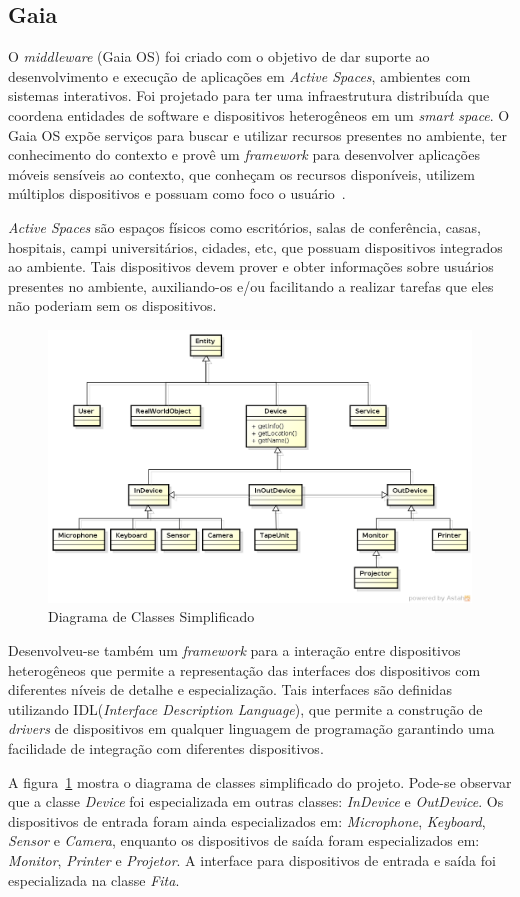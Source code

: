 \subsection{Gaia}
O \emph{middleware} (Gaia OS) foi criado com o objetivo de dar suporte ao desenvolvimento e execução de aplicações em \emph{Active Spaces}, ambientes com sistemas interativos. Foi projetado para ter uma infraestrutura distribuída que coordena entidades de software e dispositivos heterogêneos em um \emph{smart space}. O Gaia OS expõe serviços para buscar e utilizar recursos presentes no ambiente, ter conhecimento do contexto e provê um \emph{framework} para desenvolver aplicações móveis sensíveis ao contexto, que conheçam os recursos disponíveis, utilizem múltiplos dispositivos e possuam como foco o usuário~\cite{gaia2002}.

\emph{Active Spaces} são espaços físicos como escritórios, salas de conferência, casas, hospitais, campi universitários, cidades, etc, que possuam dispositivos integrados ao ambiente. Tais dispositivos devem prover e obter informações sobre usuários presentes no ambiente, auxiliando-os e/ou facilitando a realizar tarefas que eles não poderiam sem os dispositivos.

\begin{figure}[ht]
\center
\includegraphics[scale=0.5]{imagens/gaia-devices}
\caption{Diagrama de Classes Simplificado~\cite{gaiaDevices}}
\label{fig:gaiaClassDiagram}
\end{figure}

Desenvolveu-se também um \emph{framework} para a interação entre dispositivos heterogêneos que permite a representação das interfaces dos dispositivos com diferentes níveis de detalhe e especialização. Tais interfaces são definidas utilizando IDL(\emph{Interface Description Language}), que permite a construção de \emph{drivers} de dispositivos em qualquer linguagem de programação garantindo uma facilidade de integração com diferentes dispositivos.

A figura~\ref{fig:gaiaClassDiagram} mostra o diagrama de classes simplificado do projeto. Pode-se observar que a classe \emph{Device} foi especializada em outras classes: \emph{InDevice} e \emph{OutDevice}. Os dispositivos de entrada foram ainda especializados em: \emph{Microphone}, \emph{Keyboard}, \emph{Sensor} e \emph{Camera}, enquanto os dispositivos de saída foram especializados em: \emph{Monitor}, \emph{Printer} e \emph{Projetor}. A interface para dispositivos de entrada e saída foi especializada na classe \emph{Fita}.